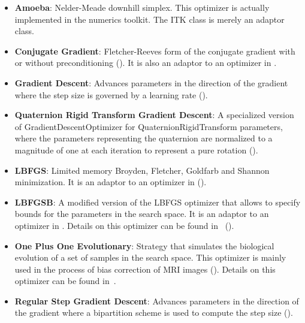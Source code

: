 \begin{itemize}

\item \textbf{Amoeba}: Nelder-Meade downhill simplex.  This optimizer is
actually implemented in the  numerics toolkit.  The ITK class
 is merely an adaptor class.

\item \textbf{Conjugate Gradient}: Fletcher-Reeves form
of the conjugate gradient with or without preconditioning
(). It is also an adaptor to an optimizer in
.

\item \textbf{Gradient Descent}: Advances parameters in the direction of the
gradient where the step size is governed by a learning rate
().

\item \textbf{Quaternion Rigid Transform Gradient Descent}: A specialized
version of GradientDescentOptimizer for QuaternionRigidTransform parameters,
where the parameters representing the quaternion are normalized to a magnitude
of one at each iteration to represent a pure rotation
().

\item \textbf{LBFGS}: Limited memory Broyden, Fletcher, Goldfarb
and Shannon minimization. It is an adaptor to an optimizer in 
().

\item \textbf{LBFGSB}: A modified version of the LBFGS optimizer that allows to
specify bounds for the parameters in the search space.  It is an adaptor to an
optimizer in . Details on this optimizer can be found
in~\cite{Byrd1995,Zhu1997} ().

\item \textbf{One Plus One Evolutionary}: Strategy that simulates the
biological evolution of a set of samples in the search space. This optimizer is
mainly used in the process of bias correction of MRI images
(). Details on this optimizer can be
found in~\cite{Styner2000}.

\item \textbf{Regular Step Gradient Descent}: Advances parameters in the
direction of the gradient where a bipartition scheme is used to compute
the step size ().


\end{itemize}
